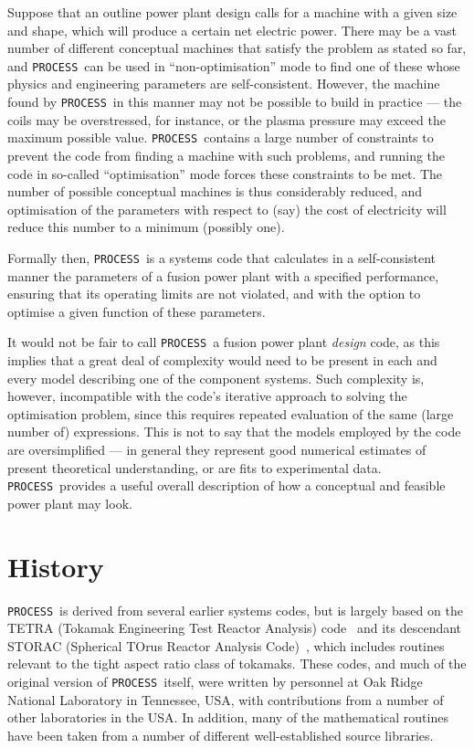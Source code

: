 \documentclass[11pt,a4paper]{report}
\newcommand{\process}{\mbox{\texttt{PROCESS}}}
\begin{document}
Suppose that an outline power plant design calls for a machine with a given
size and shape, which will produce a certain net electric power.  There may be
a vast number of different conceptual machines that satisfy the problem as
stated so far, and \process\ can be used in ``non-optimisation'' mode to find
one of these whose physics and engineering parameters are
self-consistent. However, the machine found by \process\ in this manner may
not be possible to build in practice --- the coils may be overstressed, for
instance, or the plasma pressure may exceed the maximum possible
value. \process\ contains a large number of constraints to prevent the code
from finding a machine with such problems, and running the code in so-called
``optimisation'' mode forces these constraints to be met. The number of
possible conceptual machines is thus considerably reduced, and optimisation of
the parameters with respect to (say) the cost of electricity will reduce this
number to a minimum (possibly one).

Formally then, \process\ is a systems code that calculates in a
self-consistent manner the parameters of a fusion power plant with a specified
performance, ensuring that its operating limits are not violated, and with the
option to optimise a given function of these parameters.

It would not be fair to call \process\ a fusion power plant \textit{design}\/
code, as this implies that a great deal of complexity would need to be present
in each and every model describing one of the component systems. Such
complexity is, however, incompatible with the code's iterative approach to
solving the optimisation problem, since this requires repeated evaluation of
the same (large number of) expressions. This is not to say that the models
employed by the code are oversimplified --- in general they represent good
numerical estimates of present theoretical understanding, or are fits to
experimental data. \process\ provides a useful overall description of how a
conceptual and feasible power plant may look.

\section{History}

\process\ is derived from several earlier systems codes, but is largely based
on the TETRA (Tokamak Engineering Test Reactor Analysis) code~\cite{tetra} and
its descendant STORAC (Spherical TOrus Reactor Analysis Code)~\cite{storac},
which includes routines relevant to the tight aspect ratio class of
tokamaks. These codes, and much of the original version of \process\ itself,
were written by personnel at Oak Ridge National Laboratory in Tennessee, USA,
with contributions from a number of other laboratories in the USA\@. In
addition, many of the mathematical routines have been taken from a number of
different well-established source libraries.
\end{document}
